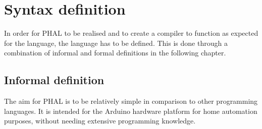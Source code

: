\chapter{Syntax definition}\label{ch:LanguageDefinitions}
In order for PHAL to be realised and to create a compiler to function as expected for the language, the language has to be defined. This is done through a combination of informal and formal definitions in the following chapter.

\section{Informal definition}
The aim for PHAL is to be relatively simple in comparison to other programming languages. 
It is intended for the Arduino hardware platform for home automation purposes, without needing extensive programming knowledge.

